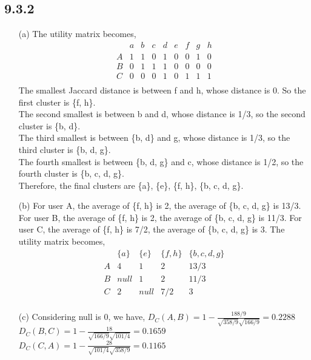 \documentclass{article}
\begin{document}
\subsection*{9.3.2}
\begin{enumerate}
    \item[(a)]
    The utility matrix becomes,\\
    \[
    \begin{array}{c|cccccccc}
    & a & b & c & d & e & f & g & h \\
    \hline
    A & 1 & 1 & 0 & 1 & 0 & 0 & 1 & 0 \\
    B & 0 & 1 & 1 & 1 & 0 & 0 & 0 & 0 \\
    C & 0 & 0 & 0 & 1 & 0 & 1 & 1 & 1 \\
    \end{array}
    \]
    The smallest Jaccard distance is between f and h, whose distance is 0. So the first cluster is \{f, h\}.\\
    The second smallest is between b and d, whose distance is 1/3, so the second cluster is \{b, d\}.\\
    The third smallest is between \{b, d\} and g, whose distance is 1/3, so the third cluster is \{b, d, g\}.\\
    The fourth smallest is between \{b, d, g\} and c, whose distance is 1/2, so the fourth cluster is \{b, c, d, g\}.\\
    Therefore, the final clusters are \{a\}, \{e\}, \{f, h\}, \{b, c, d, g\}.
    \item[(b)]
    For user A, the average of \{f, h\} is 2,
    the average of \{b, c, d, g\} is 13/3.
    For user B, the average of \{f, h\} is 2,
    the average of \{b, c, d, g\} is 11/3.
    For user C, the average of \{f, h\} is 7/2,
    the average of \{b, c, d, g\} is 3.
    The utility matrix becomes,\\
    \[
    \begin{array}{c|cccccccc}
    & \{a\} & \{e\} & \{f, h\} & \{b, c, d, g\}\\
    \hline
    A & 4 & 1 & 2 & 13/3 \\
    B & null & 1 & 2 & 11/3 \\
    C & 2 & null & 7/2 & 3 \\
    \end{array}
    \]
    
    \item[(c)]
    Considering null is 0, we have,
    \(D_C(A,B) = 1 - \frac{188/9}{\sqrt{358/9}\sqrt{166/9}} = 0.2288\)
    \(D_C(B,C) = 1 - \frac{18}{\sqrt{166/9}\sqrt{101/4}} = 0.1659\)
    \(D_C(C,A) = 1 - \frac{28}{\sqrt{101/4}\sqrt{358/9}} = 0.1165\)
    




\end{enumerate}
\end{document}

